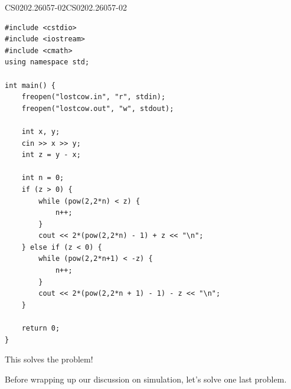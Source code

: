 \documentclass[../../../main.tex]{subfiles}
\begin{document}
\begin{solution}
\begin{cppboxSolution}{CS0202.26057-02}{CS0202.26057-02}
\begin{lstlisting}[style=cppstyle]
#include <cstdio>
#include <iostream>
#include <cmath>
using namespace std;

int main() {
    freopen("lostcow.in", "r", stdin);
    freopen("lostcow.out", "w", stdout);

    int x, y;
    cin >> x >> y;
    int z = y - x;

    int n = 0;
    if (z > 0) {
        while (pow(2,2*n) < z) {
            n++;
        }
        cout << 2*(pow(2,2*n) - 1) + z << "\n";
    } else if (z < 0) {
        while (pow(2,2*n+1) < -z) {
            n++;
        }
        cout << 2*(pow(2,2*n + 1) - 1) - z << "\n";
    }

    return 0;
}
\end{lstlisting}
\end{cppboxSolution}

This solves the problem!
\end{solution}

Before wrapping up our discussion on simulation, let's solve one last
problem.
\end{document}
